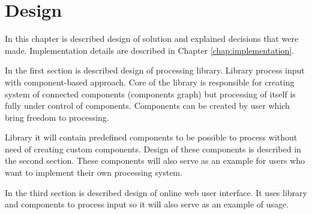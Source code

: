 
\chapter{Design}

In this chapter is described design of solution and explained decisions that were made.
Implementation details are described in Chapter \ref{chap:implementation}.

In the first section is described design of \lsystem processing library.
Library process input with component-based approach.
Core of the library is responsible for creating system of connected components (components graph) but processing of \lsystem itself is fully under control of components.
Components can be created by user which bring freedom to \lsystem processing.

Library it will contain predefined components to be possible to process \lsystems without need of creating custom components.
Design of these components is described in the second section.
These components will also serve as an example for users who want to implement their own processing system.

In the third section is described design of online web user interface.
It uses library and components to process input so it will also serve as an example of usage.
























